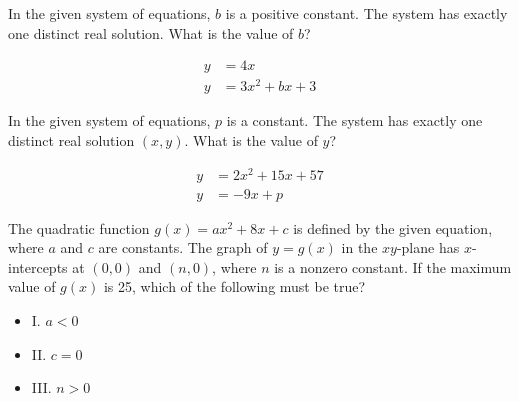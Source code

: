 \vspace{0.75em}


\vspace{2em}

\noindent\markforreview
\vspace{1em}

In the given system of equations, $b$ is a positive constant. The system has exactly one distinct real solution. What is the value of $b$?

\[
\begin{aligned}
y &= 4x \\
y &= 3x^2 + bx + 3
\end{aligned}
\]

\vspace{2em}

\noindent\markforreview
\vspace{1em}

In the given system of equations, $p$ is a constant. The system has exactly one distinct real solution $(x, y)$. What is the value of $y$?

\[
\begin{aligned}
y &= 2x^2 + 15x + 57 \\
y &= -9x + p
\end{aligned}
\]

\vspace{2em}

\noindent\markforreview
\vspace{1em}

The quadratic function $g(x) = ax^2 + 8x + c$ is defined by the given equation, where $a$ and $c$ are constants. The graph of $y = g(x)$ in the $xy$-plane has $x$-intercepts at $(0, 0)$ and $(n, 0)$, where $n$ is a nonzero constant. If the maximum value of $g(x)$ is 25, which of the following must be true?

\vspace{0.5em}

\begin{itemize}
\item I. $a < 0$
\item II. $c = 0$
\item III. $n > 0$
\end{itemize}

